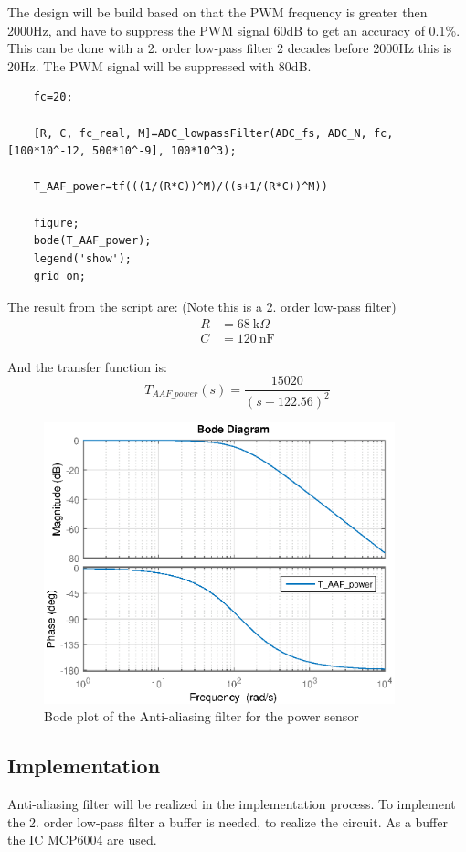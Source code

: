 The design will be build based on that the PWM frequency is greater then 2000Hz, and have to suppress the PWM signal 60dB to get an  accuracy of 0.1\%. This can be done with a 2. order low-pass filter 2 decades before 2000Hz this is 20Hz. The PWM signal will be suppressed with 80dB.
	
\begin{lstlisting}
	fc=20;
	
	[R, C, fc_real, M]=ADC_lowpassFilter(ADC_fs, ADC_N, fc, [100*10^-12, 500*10^-9], 100*10^3);
	
	T_AAF_power=tf(((1/(R*C))^M)/((s+1/(R*C))^M))
	
	figure;
	bode(T_AAF_power);
	legend('show');
	grid on;
\end{lstlisting}

The result from the script are: (Note this is a 2. order low-pass filter)
\begin{equation}
	\begin{split}
	R &= \SI{68}{\kilo\Omega}\\
	C &= \SI{120}{\nano\F}
	\end{split}
\end{equation}
	
And the transfer function is: 
\begin{equation}
	T_{{AAF\_power}}(s) = \frac{15020}{{(s + 122.56)}^{2}}
\end{equation}
	
\begin{figure}[H]
	\centering
	\includegraphics [width=4in]{Hardware/Pictures/FilterAnalyse_02.eps}
	\caption{Bode plot of the Anti-aliasing filter for the power sensor}
	\label{fig:BODE_AAF_power}
\end{figure}

\subsection{Implementation}
Anti-aliasing filter will be realized in the implementation process. To implement the 2. order low-pass filter a buffer is needed, to realize the circuit. As a buffer the IC MCP6004 are used.
	
